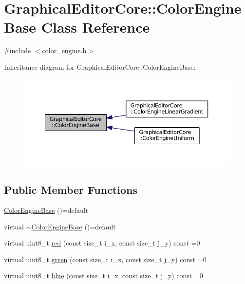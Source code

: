 \hypertarget{classGraphicalEditorCore_1_1ColorEngineBase}{}\section{Graphical\+Editor\+Core\+:\+:Color\+Engine\+Base Class Reference}
\label{classGraphicalEditorCore_1_1ColorEngineBase}


{\ttfamily \#include $<$color\+\_\+engine.\+h$>$}



Inheritance diagram for Graphical\+Editor\+Core\+:\+:Color\+Engine\+Base\+:
\nopagebreak
\begin{figure}[H]
\begin{center}
\leavevmode
\includegraphics[width=350pt]{classGraphicalEditorCore_1_1ColorEngineBase__inherit__graph}
\end{center}
\end{figure}
\subsection*{Public Member Functions}
\begin{DoxyCompactItemize}
\item 
\hyperlink{classGraphicalEditorCore_1_1ColorEngineBase_ae9aaf24b0d10206078560352af041058}{Color\+Engine\+Base} ()=default
\item 
virtual \hyperlink{classGraphicalEditorCore_1_1ColorEngineBase_a286d4bf617e3cfa67084e436020cd722}{$\sim$\+Color\+Engine\+Base} ()=default
\item 
virtual uint8\+\_\+t \hyperlink{classGraphicalEditorCore_1_1ColorEngineBase_a9d0b1a48ea117d8f47c43b9c63982dc5}{red} (const size\+\_\+t i\+\_\+x, const size\+\_\+t j\+\_\+y) const =0
\item 
virtual uint8\+\_\+t \hyperlink{classGraphicalEditorCore_1_1ColorEngineBase_a748837e34f2bf4409ae36a5d9ea02e27}{green} (const size\+\_\+t i\+\_\+x, const size\+\_\+t j\+\_\+y) const =0
\item 
virtual uint8\+\_\+t \hyperlink{classGraphicalEditorCore_1_1ColorEngineBase_a86a1c186366f3df9469e36421167f8cb}{blue} (const size\+\_\+t i\+\_\+x, const size\+\_\+t j\+\_\+y) const =0
\end{DoxyCompactItemize}


